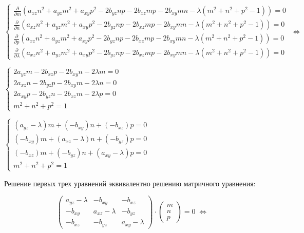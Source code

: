 \begin{center}
	$\begin{cases}
		\frac{\partial}{\partial m} \left(a_{xz} n^2 + a_{yz} m^2 + a_{xy} p^2 - 2 b_{yz} n p - 2 b_{xz} m p  - 2 b_{xy} m n - \lambda (m^2 + n^2 + p^2-1)\right) = 0 \\
		\frac{\partial}{\partial n} \left(a_{xz} n^2 + a_{yz} m^2 + a_{xy} p^2 - 2 b_{yz} n p - 2 b_{xz} m p  - 2 b_{xy} m n - \lambda (m^2 + n^2 + p^2-1)\right) = 0 \\
		\frac{\partial}{\partial p} \left(a_{xz} n^2 + a_{yz} m^2 + a_{xy} p^2 - 2 b_{yz} n p - 2 b_{xz} m p  - 2 b_{xy} m n - \lambda (m^2 + n^2 + p^2-1)\right) = 0 \\
		\frac{\partial}{\partial \lambda} \left(a_{xz} n^2 + a_{yz} m^2 + a_{xy} p^2 - 2 b_{yz} n p - 2 b_{xz} m p  - 2 b_{xy} m n - \lambda (m^2 + n^2 + p^2-1)\right) = 0
	\end{cases} \; \Leftrightarrow \;$
\end{center}

\begin{center}
	$\begin{cases}
		2 a_{yz} m - 2 b_{xz} p - 2 b_{xy} n - 2 \lambda m = 0 \\
		2 a_{xz} n - 2 b_{yz} p - 2 b_{xy} m - 2 \lambda n = 0 \\
		2 a_{xy} p - 2 b_{yz} n - 2 b_{xz} m - 2 \lambda p = 0 \\
		m^2 + n^2 + p^2 = 1
	\end{cases}$
\end{center}

\begin{center}
	$\begin{cases}
		(a_{yz} - \lambda ) m + (-b_{xy}) n + (-b_{xz}) p = 0 \\
		(-b_{xy})m + (a_{xz} - \lambda)n + (-b_{yz})p = 0 \\
		(-b_{xz})m + (-b_{yz})n + (a_{xy} - \lambda)p = 0 \\ 
		m^2 + n^2 + p^2 = 1
	\end{cases}$
\end{center}

Решение первых трех уравнений эквивалентно решению матричного уравнения:

$$\begin{pmatrix}
	a_{yz} - \lambda & -b_{xy} & -b_{xz} \\
	-b_{xy} & a_{xz} - \lambda & -b_{yz} \\
	-b_{xz} & -b_{yz} & a_{xy} - \lambda
\end{pmatrix}\cdot \begin{pmatrix}
	m \\ n \\ p
\end{pmatrix} = 0 \; \Leftrightarrow \; $$

